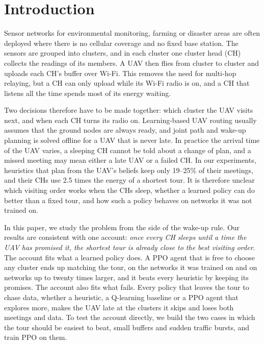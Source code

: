 \documentclass[conference]{IEEEtran}
\begin{document}
\section{Introduction}

Sensor networks for environmental monitoring, farming or disaster areas are often deployed
where there is no cellular coverage and no fixed base station. The sensors are grouped into
clusters, and in each cluster one cluster head (CH) collects the readings of its members. A UAV
then flies from cluster to cluster and uploads each CH's buffer over Wi-Fi. This removes the
need for multi-hop relaying, but a CH can only upload while its Wi-Fi radio is on, and a CH that
listens all the time spends most of its energy waiting.

Two decisions therefore have to be made together: which cluster the UAV visits next, and when
each CH turns its radio on. Learning-based UAV routing
\cite{bayerlein2018trajectory,zhu2021uav,wang2022learning} usually assumes that the ground nodes
are always ready, and joint path and wake-up planning \cite{zhan2018energy} is solved offline for
a UAV that is never late. In practice the arrival time of the UAV varies, a sleeping CH cannot
be told about a change of plan, and a missed meeting may mean either a late UAV or a failed CH.
In our experiments, heuristics that plan from the UAV's beliefs keep only 19--25\% of their
meetings, and their CHs use 2.5 times the energy of a shortest tour. It is therefore unclear
which visiting order works when the CHs sleep, whether a learned policy can do better than a
fixed tour, and how such a policy behaves on networks it was not trained on.

In this paper, we study the problem from the side of the wake-up rule. Our results are
consistent with one account: \emph{once every CH sleeps until a time the UAV has promised it,
the shortest tour is already close to the best visiting order}. The account fits what a learned
policy does. A PPO agent that is free to choose any cluster ends up matching the tour, on the
networks it was trained on and on networks up to twenty times larger, and it beats every
heuristic by keeping its promises. The account also fits what fails. Every policy that leaves
the tour to chase data, whether a heuristic, a Q-learning baseline or a PPO agent that explores
more, makes the UAV late at the clusters it skips and loses both meetings and data. To test the
account directly, we build the two cases in which the tour should be easiest to beat, small
buffers and sudden traffic bursts, and train PPO on them.
\end{document}
